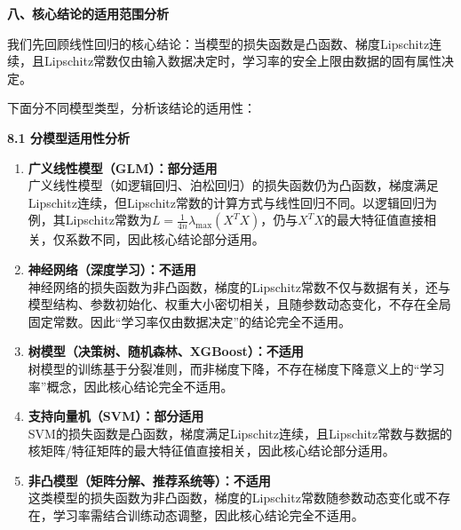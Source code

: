 \documentclass[10pt]{article}
\numberwithin{equation}{section}
\theoremstyle{plain}
\theoremstyle{definition}
\theoremstyle{remark}
\begin{document}
{\par\vspace{1ex}\noindent\large\bfseries\color{brandD} 八、核心结论的适用范围分析\par}\par\vspace{0.5ex}
我们先回顾线性回归的核心结论：当模型的损失函数是凸函数、梯度Lipschitz连续，且Lipschitz常数仅由输入数据决定时，学习率的安全上限由数据的固有属性决定。

下面分不同模型类型，分析该结论的适用性：

{\par\vspace{0.8ex}\noindent\normalsize\bfseries\color{accentD} 8.1 分模型适用性分析\par}
\begin{enumerate}[label=\arabic*., leftmargin=*]
    \item \textbf{广义线性模型（GLM）：部分适用}\\
    广义线性模型（如逻辑回归、泊松回归）的损失函数仍为凸函数，梯度满足Lipschitz连续，但Lipschitz常数的计算方式与线性回归不同。以逻辑回归为例，其Lipschitz常数为$L = \frac{1}{4n} \lambda_{\text{max}}(X^T X)$，仍与$X^T X$的最大特征值直接相关，仅系数不同，因此核心结论部分适用。
    \item \textbf{神经网络（深度学习）：不适用}\\
    神经网络的损失函数为非凸函数，梯度的Lipschitz常数不仅与数据有关，还与模型结构、参数初始化、权重大小密切相关，且随参数动态变化，不存在全局固定常数。因此“学习率仅由数据决定”的结论完全不适用。
    \item \textbf{树模型（决策树、随机森林、XGBoost）：不适用}\\
    树模型的训练基于分裂准则，而非梯度下降，不存在梯度下降意义上的“学习率”概念，因此核心结论完全不适用。
    \item \textbf{支持向量机（SVM）：部分适用}\\
    SVM的损失函数是凸函数，梯度满足Lipschitz连续，且Lipschitz常数与数据的核矩阵/特征矩阵的最大特征值直接相关，因此核心结论部分适用。
    \item \textbf{非凸模型（矩阵分解、推荐系统等）：不适用}\\
    这类模型的损失函数为非凸函数，梯度的Lipschitz常数随参数动态变化或不存在，学习率需结合训练动态调整，因此核心结论完全不适用。
\end{enumerate}
\end{document}
